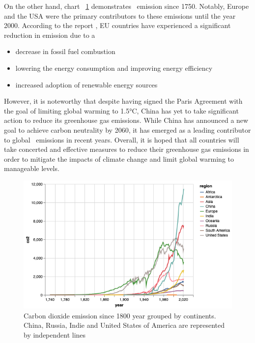 \newpage 
On the other hand, chart ~\ref{fig:co2_emission_by_region} demonstrates \coo\ emission since 1750. 
Notably, Europe and the USA were the primary contributors to these emissions until the year 2000. 
According to the report \cite{why-are-greenhouse-gases-decreasing}, EU countries have experienced a significant reduction in emission due to a 
\begin{itemize}
  \item decrease in fossil fuel combustion
  \item lowering the energy consumption and improving energy efficiency
  \item increased adoption of renewable energy sources
\end{itemize}
However, it is noteworthy that despite having signed the Paris Agreement with the goal of limiting global warming to 1.5°C, China has yet to take significant action to reduce its greenhouse gas emissions. While China has announced a new goal to achieve carbon neutrality by 2060, it has emerged as a leading contributor to global \coo\ emissions in recent years.
\newline
Overall, it is hoped that all countries will take concerted and effective measures to reduce their greenhouse gas emissions in order to mitigate the impacts of climate change and limit global warming to manageable levels.

\begin{figure}[h]
  \includegraphics[width=\linewidth]{img/co2emission_by_region.png}
  \caption{Carbon dioxide emission since 1800 year grouped by continents. China, Russia, Indie and United States of America are represented by independent lines}
  \label{fig:co2_emission_by_region}
\end{figure}

